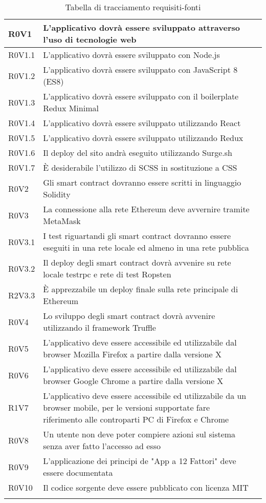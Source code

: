 \documentclass[AnalisiDeiRequisiti.tex]{subfiles}
\begin{document}
\begin{longtable}[H]{|p{2cm}|p{5cm}|p{5cm}|}
	R0V1 &  L'applicativo dovrà essere sviluppato attraverso l'uso di tecnologie web &  \\ \hline
	R0V1.1 &  L'applicativo dovrà essere sviluppato con Node.js &  \\ \hline
	R0V1.2 &  L'applicativo dovrà essere sviluppato con JavaScript 8 (ES8) &  \\ \hline
	R0V1.3 &  L'applicativo dovrà essere sviluppato con il boilerplate Redux Minimal &  \\ \hline
	R0V1.4 &  L'applicativo dovrà essere sviluppato utilizzando React &  \\ \hline
	R0V1.5 &  L'applicativo dovrà essere sviluppato utilizzando Redux &  \\ \hline
	R0V1.6 &  Il deploy del sito andrà eseguito utilizzando Surge.sh &  \\ \hline
	R0V1.7 &  È desiderabile l'utilizzo di SCSS in sostituzione a CSS &  \\ \hline
	R0V2 &  Gli smart contract dovranno essere scritti in linguaggio Solidity &  \\ \hline
	R0V3 &  La connessione alla rete Ethereum deve avvernire tramite MetaMask &  \\ \hline
	R0V3.1 &  I test riguartandi gli smart contract dovranno essere eseguiti in una rete locale ed almeno in una rete pubblica &  \\ \hline
	R0V3.2 &  Il deploy degli smart contract dovrà avvenire su rete locale testrpc e rete di test Ropsten &  \\ \hline
	R2V3.3 &  È apprezzabile un deploy finale sulla rete principale di Ethereum &  \\ \hline
	R0V4 &  Lo sviluppo degli smart contract dovrà avvenire utilizzando il framework Truffle &  \\ \hline
	R0V5 &  L'applicativo deve essere accessibile ed utilizzabile dal browser Mozilla Firefox a partire dalla versione X &  \\ \hline
	R0V6 &  L'applicativo deve essere accessibile ed utilizzabile dal browser Google Chrome a partire dalla versione X &  \\ \hline
	R1V7 &  L'applicativo deve essere accessibile ed utilizzabile da un browser mobile, per le versioni supportate fare riferimento alle controparti PC di Firefox e Chrome &  \\ \hline
	R0V8 &  Un utente non deve poter compiere azioni sul sistema senza aver fatto l'accesso ad esso &  \\ \hline
	R0V9 &  L'applicazione dei principi de "App a 12 Fattori" deve essere documentata &  \\ \hline
	R0V10 &  Il codice sorgente deve essere pubblicato con licenza MIT &  \\ \hline
	\caption{Tabella di tracciamento requisiti-fonti}
\end{longtable}
\end{document}
